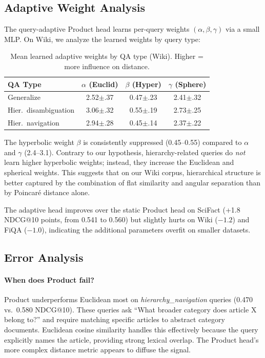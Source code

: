 \documentclass{article}
\begin{document}
\subsection{Adaptive Weight Analysis}

The query-adaptive Product head learns per-query weights $(\alpha, \beta, \gamma)$ via a small MLP. On Wiki, we analyze the learned weights by query type:

\begin{table}[h]
\centering
\small
\caption{Mean learned adaptive weights by QA type (Wiki). Higher = more influence on distance.}
\vspace{0.2cm}
\begin{tabular}{@{}lccc@{}}
\toprule
QA Type & $\alpha$ (Euclid) & $\beta$ (Hyper) & $\gamma$ (Sphere) \\
\midrule
Generalize           & 2.52{\scriptsize$\pm$.37} & 0.47{\scriptsize$\pm$.23} & 2.41{\scriptsize$\pm$.32} \\
Hier.\ disambiguation & 3.06{\scriptsize$\pm$.32} & 0.55{\scriptsize$\pm$.19} & 2.73{\scriptsize$\pm$.25} \\
Hier.\ navigation     & 2.94{\scriptsize$\pm$.28} & 0.45{\scriptsize$\pm$.14} & 2.37{\scriptsize$\pm$.22} \\
\bottomrule
\end{tabular}
\end{table}

The hyperbolic weight $\beta$ is consistently suppressed (0.45--0.55) compared to $\alpha$ and $\gamma$ (2.4--3.1). Contrary to our hypothesis, hierarchy-related queries do \emph{not} learn higher hyperbolic weights; instead, they increase the Euclidean and spherical weights. This suggests that on our Wiki corpus, hierarchical structure is better captured by the combination of flat similarity and angular separation than by Poincar\'e distance alone.

The adaptive head improves over the static Product head on SciFact (+1.8 NDCG@10 points, from 0.541 to 0.560) but slightly hurts on Wiki ($-1.2$) and FiQA ($-1.0$), indicating the additional parameters overfit on smaller datasets.

\subsection{Error Analysis}

\paragraph{When does Product fail?}
Product underperforms Euclidean most on \emph{hierarchy\_navigation} queries (0.470 vs.\ 0.580 NDCG@10). These queries ask ``What broader category does article X belong to?'' and require matching specific articles to abstract category documents. Euclidean cosine similarity handles this effectively because the query explicitly names the article, providing strong lexical overlap. The Product head's more complex distance metric appears to diffuse the signal.
\end{document}
